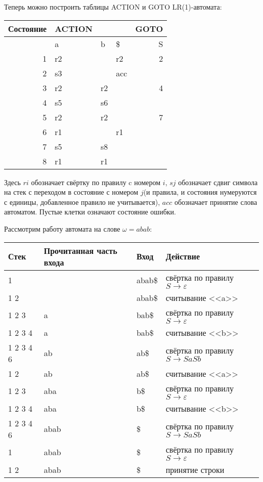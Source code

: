 \documentclass[11pt]{article}
\begin{document}
Теперь можно построить таблицы ACTION и GOTO LR(1)-автомата:
\begin{center}
\begin{tabular}{rlllr}
\hline
Состояние & ACTION &  &  & GOTO\\
\hline
 & a & b & \$ & S\\
\hline
1 & r2 &  & r2 & 2\\
2 & s3 &  & acc & \\
3 & r2 & r2 &  & 4\\
4 & s5 & s6 &  & \\
5 & r2 & r2 &  & 7\\
6 & r1 &  & r1 & \\
7 & s5 & s8 &  & \\
8 & r1 & r1 &  & \\
\hline
\end{tabular}
\end{center}
Здесь \(ri\) обозначает свёртку по правилу c номером \(i\), \(sj\) обозначает сдвиг символа на стек
с переходом в состояние с номером \(j\)(и правила, и состояния нумеруются с единицы,
добавленное правило не учитывается), \(acc\) обозначает принятие слова автоматом. Пустые клетки
означают состояние ошибки.

Рассмотрим работу автомата на слове \(\omega = abab\):
\begin{center}
\begin{tabular}{llll}
\hline
Стек & Прочитанная часть входа & Вход & Действие\\
\hline
1 &  & abab\$ & свёртка по правилу \(S \rightarrow \varepsilon\)\\
1 2 &  & abab\$ & считывание {}<<a>>{}\\
1 2 3 & a & bab\$ & свёртка по правилу \(S \rightarrow \varepsilon\)\\
1 2 3 4 & a & bab\$ & считывание {}<<b>>{}\\
1 2 3 4 6 & ab & ab\$ & свёртка по правилу \(S \rightarrow SaSb\)\\
1 2 & ab & ab\$ & считывание {}<<a>>{}\\
1 2 3 & aba & b\$ & свёртка по правилу \(S \rightarrow \varepsilon\)\\
1 2 3 4 & aba & b\$ & считывание {}<<b>>{}\\
1 2 3 4 6 & abab & \$ & свёртка по правилу \(S \rightarrow SaSb\)\\
1 & abab & \$ & свёртка по правилу \(S \rightarrow \varepsilon\)\\
1 2 & abab & \$ & принятие строки\\
\hline
\end{tabular}
\end{center}
\end{document}
